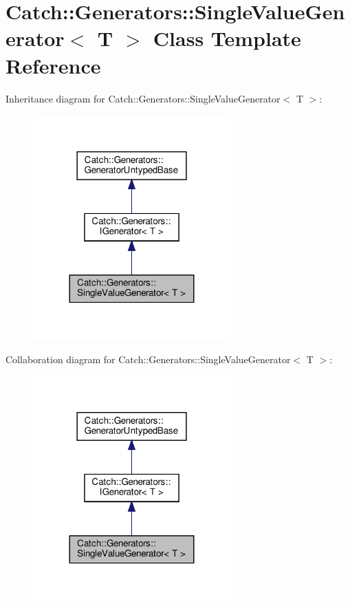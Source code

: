 \hypertarget{classCatch_1_1Generators_1_1SingleValueGenerator}{}\section{Catch\+:\+:Generators\+:\+:Single\+Value\+Generator$<$ T $>$ Class Template Reference}
\label{classCatch_1_1Generators_1_1SingleValueGenerator}


Inheritance diagram for Catch\+:\+:Generators\+:\+:Single\+Value\+Generator$<$ T $>$\+:
\nopagebreak
\begin{figure}[H]
\begin{center}
\leavevmode
\includegraphics[width=215pt]{classCatch_1_1Generators_1_1SingleValueGenerator__inherit__graph}
\end{center}
\end{figure}


Collaboration diagram for Catch\+:\+:Generators\+:\+:Single\+Value\+Generator$<$ T $>$\+:
\nopagebreak
\begin{figure}[H]
\begin{center}
\leavevmode
\includegraphics[width=215pt]{classCatch_1_1Generators_1_1SingleValueGenerator__coll__graph}
\end{center}
\end{figure}
